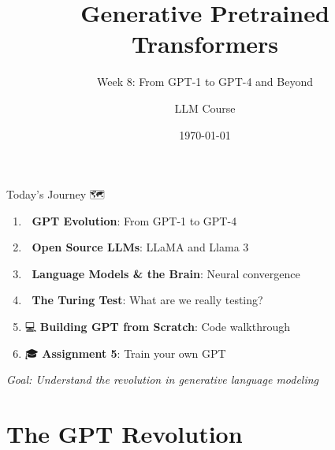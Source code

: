 \documentclass[aspectratio=169]{beamer}
\title{Generative Pretrained Transformers}
\subtitle{Week 8: From GPT-1 to GPT-4 and Beyond}
\author{LLM Course}
\date{\today}
\begin{document}
\begin{frame}
\titlepage
\end{frame}

\begin{frame}{Today's Journey 🗺️}
\large
\begin{enumerate}
    \item 🚀 \textbf{GPT Evolution}: From GPT-1 to GPT-4
    \item 🦙 \textbf{Open Source LLMs}: LLaMA and Llama 3
    \item 🧠 \textbf{Language Models \& the Brain}: Neural convergence
    \item 🤖 \textbf{The Turing Test}: What are we really testing?
    \item 💻 \textbf{Building GPT from Scratch}: Code walkthrough
    \item 🎓 \textbf{Assignment 5}: Train your own GPT
\end{enumerate}

\vspace{1em}
\textit{Goal: Understand the revolution in generative language modeling}
\end{frame}

\section{The GPT Revolution}
\end{document}
